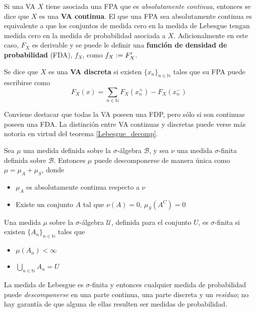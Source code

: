 Si una VA $X$ tiene asociada una FPA que es \textit{absolutamente continua}, entonces se dice que 
$X$ es una \textbf{VA continua}. 
%
El que una FPA sea absolutamente continua es equivalente a que los conjuntos de medida cero en la 
medida de Lebesgue tengan medida cero en la medida de probabilidad asociada a $X$.
%
Adicionalmente en este caso, $F_X$ es derivable y se puede le definir una \textbf{función de 
densidad de probabilidad} (FDA), $f_X$, como $f_X := F_X^{\prime}$.

Se dice que $X$ es una \textbf{VA discreta} si existen $\{ x_n \}_{n\in \mathbb{N}}$ tales que su 
FPA puede escribirse como
%
\begin{equation*}
F_X(x) = \sum_{n \in \mathbb{N}} F_X(x_n^+) - F_X(x_n^-)
\end{equation*}

Conviene destacar que todas la VA poseen una FDP, pero sólo si son continuas poseen una FDA. La
distinción entre VA continuas y discretas puede verse más notoria en virtud del teorema 
\ref{Lebesgue_decomp}.

\begin{teorema}
Sea $\mu$ una medida definida sobre la $\sigma$-álgebra $\mathcal{B}$, y sea $\nu$ una medida 
$\sigma$-finita definida sobre $\mathcal{B}$. Entonces $\mu$ puede descomponerse de manera única como
$\mu = \mu_A + \mu_S$, donde
\begin{itemize}
\item $\mu_A$ es absolutamente continua respecto a $\nu$
\item Existe un conjunto $A$ tal que $\nu(A)=0$, $\mu_S\left(A^{C}\right) = 0$
\end{itemize}
\label{Lebesgue_decomp}
\end{teorema}

\begin{definicion}
Una medida $\mu$ sobre la $\sigma$-álgebra $\mathcal{U}$, definida para el conjunto $U$, es 
$\sigma$-finita si existen $\{ A_n \}_{n\in \mathbb{N}}$ tales que
\begin{itemize}
\item $\mu\left( A_n \right) < \infty$
\item $\displaystyle \bigcup_{n\in \mathbb{N}} A_n = U$
\end{itemize}
\end{definicion}

La medida de Lebesgue es $\sigma$-finita y entonces cualquier medida de probabilidad puede 
\textit{descomponerse} en una parte continua, una parte discreta y un \textit{residuo}; no hay
garantía de que alguna de ellas resulten ser medidas de probabilidad.

